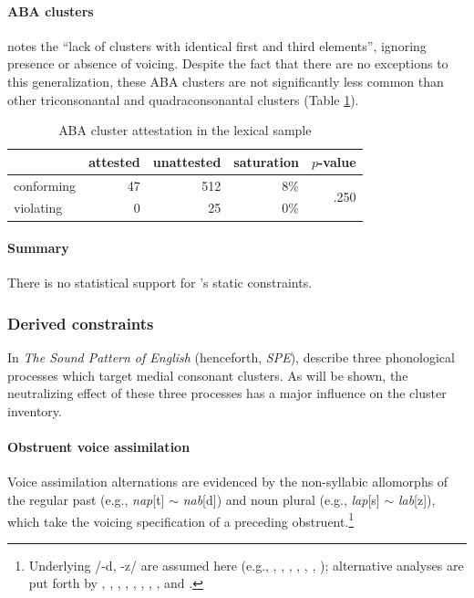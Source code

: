 \paragraph{ABA clusters} 
\citet[176]{Pierrehumbert1994} notes the ``lack of clusters with identical first and third elements'', ignoring presence or absence of voicing. 
Despite the fact that there are no exceptions to this generalization, these \textsc{ABA} clusters are not significantly less common than other triconsonantal and quadraconsonantal clusters (Table \ref{abatab}).

\begin{table}
\centering
\begin{tabular}{l rrrr}
\toprule
           & attested & unattested & saturation & $p$-value \\
\midrule
conforming & 47       & 512        &  8\%       & \multirow{2}{*}{.250} \\
violating  &  0       &  25        &  0\%       \\
\bottomrule
\end{tabular}
\caption{ABA cluster attestation in the lexical sample}
\label{abatab}
\end{table}

\paragraph{Summary} 
There is no statistical support for \citeauthor{Pierrehumbert1994}'s static constraints.

\subsubsection{Derived constraints}

In \emph{The Sound Pattern of English} (henceforth, \emph{SPE}), \citet{SPE} describe three phonological processes which target medial consonant clusters. As will be shown, the neutralizing effect of these three processes has a major influence on the cluster inventory.

\paragraph{Obstruent voice assimilation}
\label{ova}

Voice assimilation alternations are evidenced by the non-syllabic allomorphs of the regular past (e.g., \emph{nap}[t] $\sim$ \emph{nab}[d]) and noun plural (e.g., \emph{lap}[s] $\sim$ \emph{lab}[z]), which take the voicing specification of a preceding obstruent.\footnote{Underlying /-d, -z/ are assumed here (e.g., \citealt{Anderson1973a}, \citealt[284f.]{Bakovic2005b}, \citealt{Basboll1972}, \citealt[210]{SPE}, \citealt[282]{Hockett1958}, \citealt[102]{Pinker1988}, \citealt{Shibatani1972}); alternative analyses are put forth by \citet[210f.]{LANGUAGE}, \citet[135]{Borowsky1986}, \citet{Hoard1971}, \citet{Kiparsky1985}, \citet{Lightner1970}, \citet{Luelsdorff1969}, \citet{Miner1975}, \citet[426]{Nida1948}, and \citet{Zwicky1975}.}

